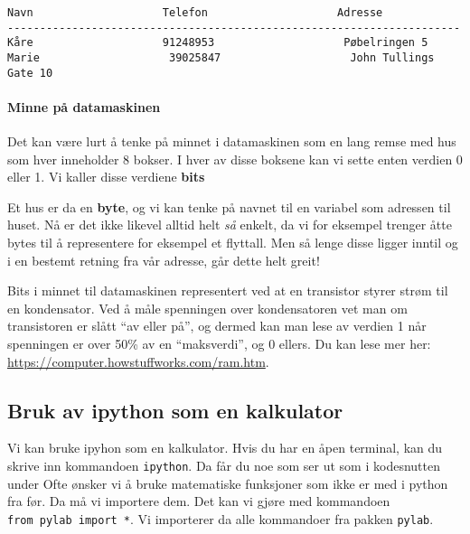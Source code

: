 \documentclass[11pt]{article}
\begin{document}
    \begin{Verbatim}[commandchars=\\\{\}]
Navn                    Telefon                    Adresse
----------------------------------------------------------------------
Kåre                    91248953                    Pøbelringen 5
Marie                    39025847                    John Tullings Gate 10
    \end{Verbatim}

    \hypertarget{minne-puxe5-datamaskinen}{%
\paragraph{Minne på datamaskinen}\label{minne-puxe5-datamaskinen}}

Det kan være lurt å tenke på minnet i datamaskinen som en lang remse med
hus som hver inneholder 8 bokser. I hver av disse boksene kan vi sette
enten verdien 0 eller 1. Vi kaller disse verdiene \textbf{bits}

Et hus er da en \textbf{byte}, og vi kan tenke på navnet til en variabel
som adressen til huset. Nå er det ikke likevel alltid helt \emph{så}
enkelt, da vi for eksempel trenger åtte bytes til å representere for
eksempel et flyttall. Men så lenge disse ligger inntil og i en bestemt
retning fra vår adresse, går dette helt greit!

    Bits i minnet til datamaskinen representert ved at en transistor styrer
strøm til en kondensator. Ved å måle spenningen over kondensatoren vet
man om transistoren er slått ``av eller på'', og dermed kan man lese av
verdien 1 når spenningen er over 50\% av en ``maksverdi'', og 0 ellers.
Du kan lese mer her: \url{https://computer.howstuffworks.com/ram.htm}.

    \hypertarget{bruk-av-ipython-som-en-kalkulator}{%
\subsection{Bruk av ipython som en
kalkulator}\label{bruk-av-ipython-som-en-kalkulator}}

Vi kan bruke ipyhon som en kalkulator. Hvis du har en åpen terminal, kan
du skrive inn kommandoen \texttt{ipython}. Da får du noe som ser ut som
i kodesnutten under Ofte ønsker vi å bruke matematiske funksjoner som
ikke er med i python fra før. Da må vi importere dem. Det kan vi gjøre
med kommandoen \texttt{from\ pylab\ import\ *}. Vi importerer da alle
kommandoer fra pakken \texttt{pylab}.
\end{document}
